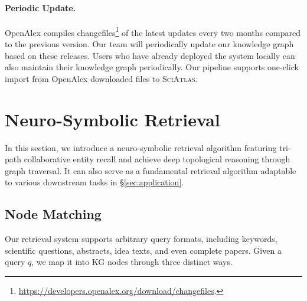 \documentclass{llmxive}
\providecommand{\ours}{\textsc{SciAtlas}}
\begin{document}
\paragraph{Periodic Update.}
OpenAlex compiles changefiles\footnote{\url{https://developers.openalex.org/download/changefiles}.} of the latest updates every two months compared to the previous version.
Our team will periodically update our knowledge graph based on these releases.
Users who have already deployed the system locally can also maintain their knowledge graph periodically.
Our pipeline supports one-click import from OpenAlex downloaded files to {\ours}.


\section{Neuro-Symbolic Retrieval}
\label{sec:retrieval}
In this section, we introduce a neuro-symbolic retrieval algorithm featuring tri-path collaborative entity recall and achieve deep topological reasoning through graph traversal.
It can also serve as a fundamental retrieval algorithm adaptable to various downstream tasks in \S\ref{sec:application}.

\subsection{Node Matching}
Our retrieval system supports arbitrary query formats, including keywords, scientific questions, abstracts, idea texts, and even complete papers.
Given a query $q$, we map it into KG nodes through three distinct ways.
\end{document}
